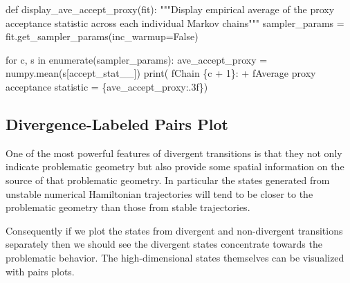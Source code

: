 \documentclass[
  letterpaper,
  DIV=11,
  numbers=noendperiod]{scrartcl}
\newenvironment{Shaded}{\begin{snugshade}}{\end{snugshade}}
\newcommand{\BuiltInTok}[1]{\textcolor[rgb]{0.00,0.23,0.31}{#1}}
\newcommand{\CommentTok}[1]{\textcolor[rgb]{0.37,0.37,0.37}{#1}}
\newcommand{\ControlFlowTok}[1]{\textcolor[rgb]{0.00,0.23,0.31}{#1}}
\newcommand{\DecValTok}[1]{\textcolor[rgb]{0.68,0.00,0.00}{#1}}
\newcommand{\KeywordTok}[1]{\textcolor[rgb]{0.00,0.23,0.31}{#1}}
\newcommand{\NormalTok}[1]{\textcolor[rgb]{0.00,0.23,0.31}{#1}}
\newcommand{\OperatorTok}[1]{\textcolor[rgb]{0.37,0.37,0.37}{#1}}
\newcommand{\SpecialCharTok}[1]{\textcolor[rgb]{0.37,0.37,0.37}{#1}}
\newcommand{\SpecialStringTok}[1]{\textcolor[rgb]{0.13,0.47,0.30}{#1}}
\newcommand{\StringTok}[1]{\textcolor[rgb]{0.13,0.47,0.30}{#1}}
\newcommand{\VariableTok}[1]{\textcolor[rgb]{0.07,0.07,0.07}{#1}}
\begin{document}
\begin{Shaded}
\begin{Highlighting}[]
\KeywordTok{def}\NormalTok{ display\_ave\_accept\_proxy(fit):}
  \CommentTok{"""Display empirical average of the proxy acceptance statistic}
\CommentTok{     across each individual Markov chains"""}
\NormalTok{  sampler\_params }\OperatorTok{=}\NormalTok{ fit.get\_sampler\_params(inc\_warmup}\OperatorTok{=}\VariableTok{False}\NormalTok{)}
  
  \ControlFlowTok{for}\NormalTok{ c, s }\KeywordTok{in} \BuiltInTok{enumerate}\NormalTok{(sampler\_params):}
\NormalTok{    ave\_accept\_proxy }\OperatorTok{=}\NormalTok{ numpy.mean(s[}\StringTok{\textquotesingle{}accept\_stat\_\_\textquotesingle{}}\NormalTok{])}
    \BuiltInTok{print}\NormalTok{(  }\SpecialStringTok{f\textquotesingle{}Chain }\SpecialCharTok{\{}\NormalTok{c }\OperatorTok{+} \DecValTok{1}\SpecialCharTok{\}}\SpecialStringTok{: \textquotesingle{}}
          \OperatorTok{+} \SpecialStringTok{f\textquotesingle{}Average proxy acceptance statistic = }\SpecialCharTok{\{}\NormalTok{ave\_accept\_proxy}\SpecialCharTok{:.3f\}}\SpecialStringTok{\textquotesingle{}}\NormalTok{)}
\end{Highlighting}
\end{Shaded}

\hypertarget{divergence-labeled-pairs-plot}{%
\subsection{Divergence-Labeled Pairs
Plot}\label{divergence-labeled-pairs-plot}}

One of the most powerful features of divergent transitions is that they
not only indicate problematic geometry but also provide some spatial
information on the source of that problematic geometry. In particular
the states generated from unstable numerical Hamiltonian trajectories
will tend to be closer to the problematic geometry than those from
stable trajectories.

Consequently if we plot the states from divergent and non-divergent
transitions separately then we should see the divergent states
concentrate towards the problematic behavior. The high-dimensional
states themselves can be visualized with pairs plots.
\end{document}
